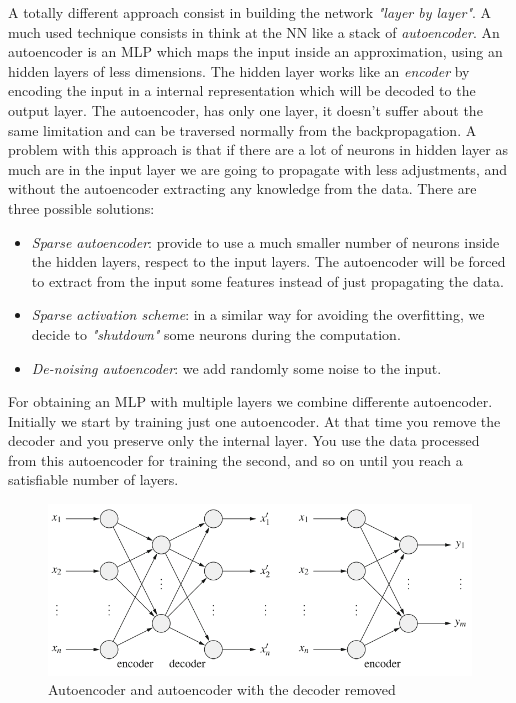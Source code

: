 \documentclass{article}
\begin{document}
A totally different approach consist in building the network \textit{"layer by layer"}. A much used
technique consists in think at the NN like a stack of \textit{autoencoder}. An autoencoder is an MLP
which maps the input inside an approximation, using an hidden layers of less dimensions. The
hidden layer works like an \textit{encoder} by encoding the input in a internal representation
which will be decoded to the output layer. The autoencoder, has only one layer, it doesn't suffer
about the same limitation and can be traversed normally from the backpropagation.
\newline\newline
A problem with this approach is that if there are a lot of neurons in hidden layer as much are in
the input layer we are going to propagate with less adjustments, and without the autoencoder
extracting any knowledge from the data.
\newline\newline
There are three possible solutions:
\begin{itemize}
    \item \textit{Sparse autoencoder}: provide to use a much smaller number of neurons inside the
          hidden layers, respect to the input layers. The autoencoder will be forced to extract from
          the input some features instead of just propagating the data.

    \item \textit{Sparse activation scheme}: in a similar way for avoiding the overfitting, we
          decide to \textit{"shutdown"} some neurons during the computation.

    \item \textit{De-noising autoencoder}: we add randomly some noise to the input.
\end{itemize}
For obtaining an MLP with multiple layers we combine differente autoencoder. Initially we start by
training just one autoencoder. At that time you remove the decoder and you preserve only the internal layer.
You use the data processed from this autoencoder for training the second, and so on until you
reach a satisfiable number of layers.
\begin{figure}
    \centering
    \includegraphics[scale=0.5]{images/autoencoder_decoder.png}
    \caption{Autoencoder and autoencoder with the decoder removed}
\end{figure}
\end{document}
